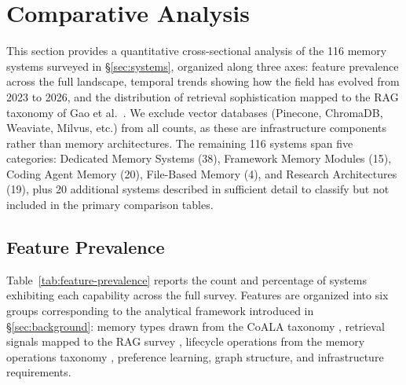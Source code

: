 \section{Comparative Analysis}
\label{sec:comparison}

This section provides a quantitative cross-sectional analysis of the 116 memory
systems surveyed in \S\ref{sec:systems}, organized along three axes: feature
prevalence across the full landscape, temporal trends showing how the field has
evolved from 2023 to 2026, and the distribution of retrieval sophistication
mapped to the RAG taxonomy of Gao et al.~\cite{gao2023rag}. We exclude vector
databases (Pinecone, ChromaDB, Weaviate, Milvus, etc.) from all counts, as
these are infrastructure components rather than memory architectures. The
remaining 116 systems span five categories: Dedicated Memory Systems (38),
Framework Memory Modules (15), Coding Agent Memory (20), File-Based Memory (4),
and Research Architectures (19), plus 20 additional systems described in
sufficient detail to classify but not included in the primary comparison
tables.

\subsection{Feature Prevalence}
\label{sec:feature-prevalence}

Table~\ref{tab:feature-prevalence} reports the count and percentage of systems
exhibiting each capability across the full survey. Features are organized into
six groups corresponding to the analytical framework introduced in
\S\ref{sec:background}: memory types drawn from the CoALA taxonomy
\cite{sumers2024coala}, retrieval signals mapped to the RAG survey
\cite{gao2023rag}, lifecycle operations from the memory operations taxonomy
\cite{zhang2024survey}, preference learning, graph structure, and
infrastructure requirements.

